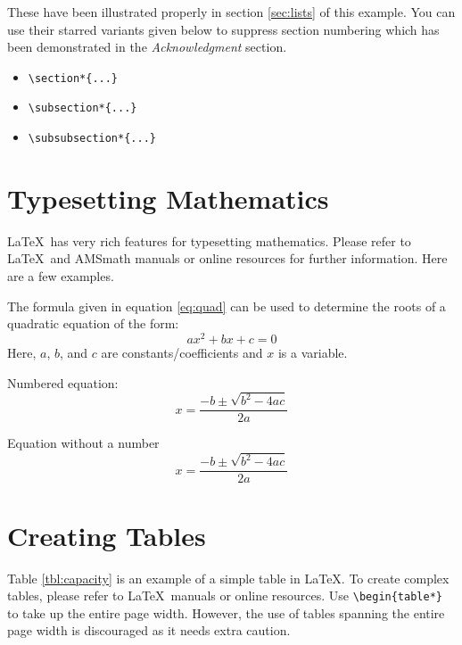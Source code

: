 \documentclass[fleqn, 11pt, twoside]{IOEGC2019}
\begin{document}
These have been illustrated properly in section \ref{sec:lists} of this example.
You can use their starred variants given below to suppress section numbering 
which has been demonstrated in the \emph{Acknowledgment} section.

\begin{itemize}[noitemsep]
	\item \verb+\section*{...}+
	\item \verb+\subsection*{...}+
	\item \verb+\subsubsection*{...}+
\end{itemize} 


\section{Typesetting Mathematics}
\LaTeX\ has very rich features for typesetting mathematics. Please refer to 
\LaTeX\ and AMSmath manuals or online resources for further information. 
Here are a few examples.

The formula given in equation \ref{eq:quad} can be used to determine the roots 
of a quadratic equation of the form: $$ax^2+bx+c=0$$
Here, $a$, $b$, and $c$ are constants/coefficients and $x$ is a variable.

Numbered equation:
\begin{equation}
	x= \frac{-b\pm \sqrt{ b^2-4ac}}{2a}
	\label{eq:quad}
\end{equation} 

Equation without a number
\begin{equation*}
	x = \frac{-b\pm \sqrt{ b^2-4ac}}{2a}
\end{equation*} 

\section{Creating Tables}
Table \ref{tbl:capacity} is an example of a simple table in \LaTeX. To create 
complex tables, please refer to \LaTeX\ manuals or online resources. Use 
\verb+\begin{table*}+ to take up the entire page width. However, the use of 
tables spanning the entire page width is discouraged as it needs extra caution.
\end{document}
